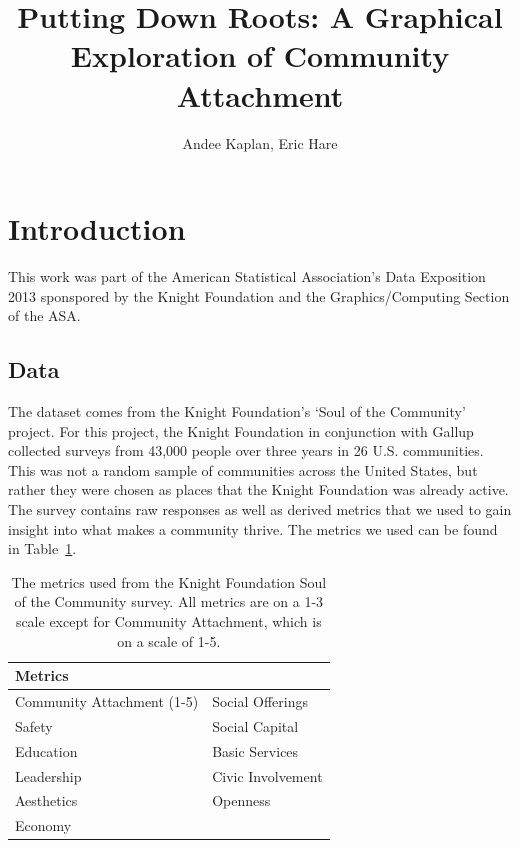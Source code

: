 \documentclass[11pt]{article}\usepackage{knitr}
\begin{document}
\setlength{\parskip}{3ex}
\setlength{\parindent}{0pt}

\title{Putting Down Roots: A Graphical Exploration of Community Attachment}
\author{Andee Kaplan, Eric Hare}

\maketitle

\setcounter{page}{1}
\section*{Introduction}

This work was part of the American Statistical Association's Data Exposition 2013 sponspored by the Knight Foundation and the Graphics/Computing Section of the ASA.

\subsection*{Data}
The dataset comes from the Knight Foundation's `Soul of the Community' project. For this project, the Knight Foundation in conjunction with Gallup collected surveys from 43,000 people over three years in 26 U.S. communities. This was not a random sample of communities across the United States, but rather they were chosen as places that the Knight Foundation was already active. The survey contains raw responses as well as derived metrics that we used to gain insight into what makes a community thrive. The metrics we used can be found in Table~\ref{tab:metrics}.

\begin{table}[H]
\centering
\begin{tabular}{l l}
\hline
Metrics & \\
\hline
Community Attachment (1-5) & Social Offerings \\
Safety & Social Capital \\
Education & Basic Services \\
Leadership & Civic Involvement \\
Aesthetics & Openness \\
Economy &  \\
\hline
\end{tabular}
\caption{\label{tab:metrics} The metrics used from the Knight Foundation Soul of the Community survey. All metrics are on a 1-3 scale except for Community Attachment, which is on a scale of 1-5.}
\end{table}
\end{document}
